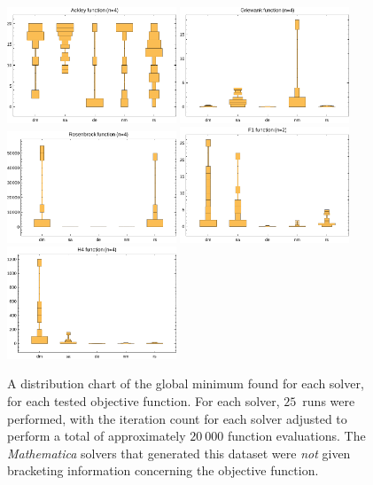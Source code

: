 \documentclass[12pt]{article}
\begin{document}
\begin{figure}[H]
\begin{center}
        \includegraphics[width=0.45\textwidth]{../figures/ackley-fun-bad.pdf}
        \includegraphics[width=0.45\textwidth]{../figures/griewank-fun-bad.pdf}
        \includegraphics[width=0.45\textwidth]{../figures/rosenbrock-fun-bad.pdf}
        \includegraphics[width=0.45\textwidth]{../figures/f1-fun-bad.pdf}
        \includegraphics[width=0.45\textwidth]{../figures/h4-fun-bad.pdf}

        \caption{
            A distribution chart of the global minimum found for each
            solver, for each tested objective function. For each solver,
            $25$~runs were performed, with the iteration count for each
            solver adjusted to perform a total of approximately $20~000$
            function evaluations. The \emph{Mathematica} solvers that
            generated this dataset were \emph{not} given bracketing
            information concerning the objective function.
        }
        \label{fig:bad-data}
    \end{center}
\end{figure}
\end{document}
